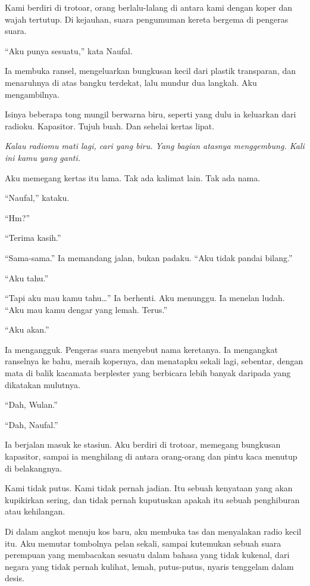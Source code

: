 \documentclass[11pt,twoside,openany]{book}
\begin{document}
Kami berdiri di trotoar, orang berlalu-lalang di antara kami dengan koper dan wajah tertutup. Di kejauhan, suara pengumuman kereta bergema di pengeras suara.

``Aku punya sesuatu,'' kata Naufal.

Ia membuka ransel, mengeluarkan bungkusan kecil dari plastik transparan, dan menaruhnya di atas bangku terdekat, lalu mundur dua langkah. Aku mengambilnya.

Isinya beberapa tong mungil berwarna biru, seperti yang dulu ia keluarkan dari radioku. Kapasitor. Tujuh buah. Dan sehelai kertas lipat.

\emph{Kalau radiomu mati lagi, cari yang biru. Yang bagian atasnya menggembung. Kali ini kamu yang ganti.}

Aku memegang kertas itu lama. Tak ada kalimat lain. Tak ada nama.

``Naufal,'' kataku.

``Hm?''

``Terima kasih.''

``Sama-sama.'' Ia memandang jalan, bukan padaku. ``Aku tidak pandai bilang.''

``Aku tahu.''

``Tapi aku mau kamu tahu\ldots{}'' Ia berhenti. Aku menunggu. Ia menelan ludah. ``Aku mau kamu dengar yang lemah. Terus.''

``Aku akan.''

Ia mengangguk. Pengeras suara menyebut nama keretanya. Ia mengangkat ranselnya ke bahu, meraih kopernya, dan menatapku sekali lagi, sebentar, dengan mata di balik kacamata berplester yang berbicara lebih banyak daripada yang dikatakan mulutnya.

``Dah, Wulan.''

``Dah, Naufal.''

Ia berjalan masuk ke stasiun. Aku berdiri di trotoar, memegang bungkusan kapasitor, sampai ia menghilang di antara orang-orang dan pintu kaca menutup di belakangnya.

Kami tidak putus. Kami tidak pernah jadian. Itu sebuah kenyataan yang akan kupikirkan sering, dan tidak pernah kuputuskan apakah itu sebuah penghiburan atau kehilangan.

Di dalam angkot menuju kos baru, aku membuka tas dan menyalakan radio kecil itu. Aku memutar tombolnya pelan sekali, sampai kutemukan sebuah suara perempuan yang membacakan sesuatu dalam bahasa yang tidak kukenal, dari negara yang tidak pernah kulihat, lemah, putus-putus, nyaris tenggelam dalam desis.
\end{document}
